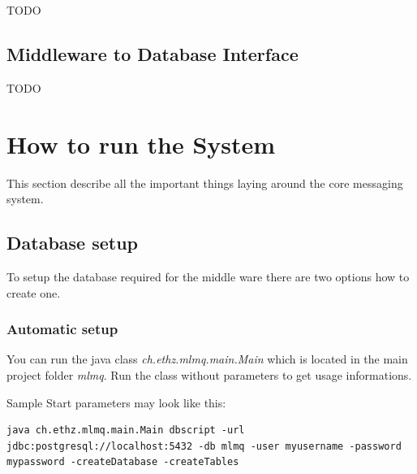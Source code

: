 \documentclass[a4paper]{article}
\begin{document}
TODO

\subsection{Middleware to Database Interface}


TODO









\section{How to run the System}

This section describe all the important things laying around the core messaging system.

\subsection{Database setup}

To setup the database required for the middle ware there are two options
how to create one.

\subsubsection{Automatic setup}
You can run the java class \textit{ch.ethz.mlmq.main.Main} which is located in the main project folder \textit{mlmq}. Run the class without parameters to get usage informations.

Sample Start parameters may look like this:

\begin{verbatim} 
java ch.ethz.mlmq.main.Main dbscript -url jdbc:postgresql://localhost:5432 -db mlmq -user myusername -password mypassword -createDatabase -createTables
\end{verbatim}
\end{document}
